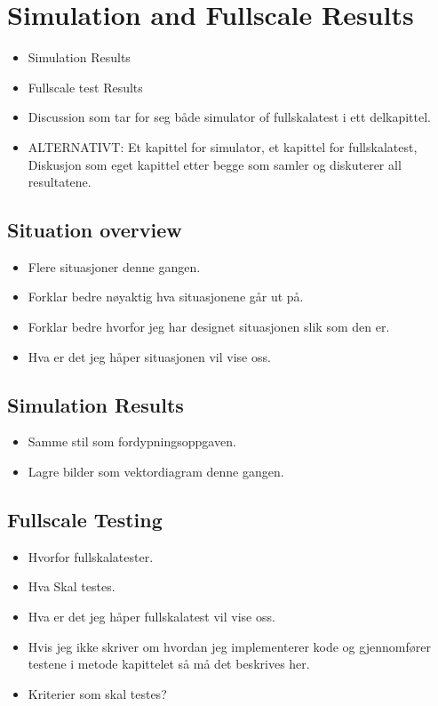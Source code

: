 \section{Simulation and Fullscale Results}
\begin{itemize}
    \item Simulation Results
    \item Fullscale test Results
    \item Discussion som tar for seg både simulator of fullskalatest i ett delkapittel.
    \item ALTERNATIVT: Et kapittel for simulator, et kapittel for fullskalatest, Diskusjon som eget kapittel etter begge som samler og diskuterer all resultatene.
\end{itemize}

\subsection{Situation overview}
\begin{itemize}
    \item Flere situasjoner denne gangen.
    \item Forklar bedre nøyaktig hva situasjonene går ut på.
    \item Forklar bedre hvorfor jeg har designet situasjonen slik som den er.
    \item Hva er det jeg håper situasjonen vil vise oss.
\end{itemize}

\subsection{Simulation Results}
\begin{itemize}
    \item Samme stil som fordypningsoppgaven.
    \item Lagre bilder som vektordiagram denne gangen.
\end{itemize}

\subsection{Fullscale Testing}
\begin{itemize}
    \item Hvorfor fullskalatester.
    \item Hva Skal testes.
    \item Hva er det jeg håper fullskalatest vil vise oss.
    \item Hvis jeg ikke skriver om hvordan jeg implementerer kode og gjennomfører testene i metode kapittelet så må det beskrives her.
    \item Kriterier som skal testes?
\end{itemize}

